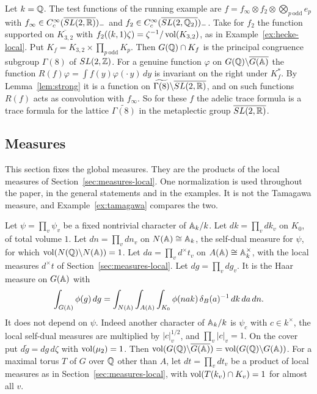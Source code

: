 \begin{example}\label{ex:test-global}
Let $k=\mathbb{Q}$. The test functions of the running example are
$f=f_\infty\otimes f_2\otimes\bigotimes_{p\ \mathrm{odd}}e_p$ with
$f_\infty\in C_c^\infty(\overline{SL(2,\mathbb{R})})_-$ and $f_2\in C_c^\infty(
\overline{SL(2,\mathbb{Q}_2)})_-$. Take for $f_2$ the function supported on
$\overline{K_{3,2}}$ with $f_2((k,1)\zeta)=\zeta^{-1}/\operatorname{vol}(K_{3,2})$, as in
Example~\ref{ex:hecke-local}. Put $K_f=K_{3,2}\times\prod_{p\ \mathrm{odd}}
K_p$. Then $G(\mathbb{Q})\cap K_f$ is the principal congruence subgroup
$\Gamma(8)$ of $SL(2,\mathbb{Z})$. For a genuine function $\varphi$ on
$G(\mathbb{Q})\backslash\overline{G(\mathbb{A})}$ the function $R(f)\varphi=\int f(y)
\varphi(\cdot\,y)\,dy$ is invariant on the right under $K_f^*$. By
Lemma~\ref{lem:strong} it is a function on $\widetilde{\Gamma(8)}
\backslash\overline{SL(2,\mathbb{R})}$, and on such functions $R(f)$ acts as
convolution with $f_\infty$. So for these $f$ the adelic trace formula is
a trace formula for the lattice $\widetilde{\Gamma(8)}$ in the
metaplectic group $\overline{SL(2,\mathbb{R})}$.
\end{example}

\subsection{Measures}\label{sec:measures-global}

This section fixes the global measures. They are the products of the
local measures of Section~\ref{sec:measures-local}. One normalization is
used throughout the paper, in the general statements and in the
examples. It is not the Tamagawa measure, and
Example~\ref{ex:tamagawa} compares the two.

Let $\psi=\prod_v\psi_v$ be a fixed nontrivial character of $\mathbb{A}_k/k$.
Let $dk=\prod_vdk_v$ on $K_0$, of total volume $1$. Let $dn=\prod_vdn_v$
on $N(\mathbb{A})\cong\mathbb{A}_k$, the self-dual measure for $\psi$, for which
$\operatorname{vol}(N(\mathbb{Q})\backslash N(\mathbb{A}))=1$. Let $da=\prod_vd^\times t_v$ on
$A(\mathbb{A})\cong\mathbb{A}_k^\times$, with the local measures $d^\times t$ of
Section~\ref{sec:measures-local}. Let
$dg=\prod_vdg_v$. It is the Haar measure on $G(\mathbb{A})$ with
\[
\int_{G(\mathbb{A})}\phi(g)\,dg=\int_{N(\mathbb{A})}\int_{A(\mathbb{A})}\int_{K_0}\phi(nak)\,
\delta_B(a)^{-1}\,dk\,da\,dn .
\]
It does not depend on $\psi$. Indeed another character of $\mathbb{A}_k/k$ is
$\psi_c$ with $c\in k^\times$, the local self-dual measures are
multiplied by $|c|_v^{1/2}$, and $\prod_v|c|_v=1$. On the cover put
$d\tilde g=dg\,d\zeta$ with $\operatorname{vol}(\mu_2)=1$. Then
$\operatorname{vol}(G(\mathbb{Q})\backslash\overline{G(\mathbb{A})})=\operatorname{vol}(G(\mathbb{Q})\backslash G(\mathbb{A}))$. For a
maximal torus $T$ of $G$ over $\mathbb{Q}$ other than $A$, let $dt=\prod_vdt_v$
be a product of local measures as in Section~\ref{sec:measures-local},
with $\operatorname{vol}(T(k_v)\cap K_v)=1$ for almost all $v$.

